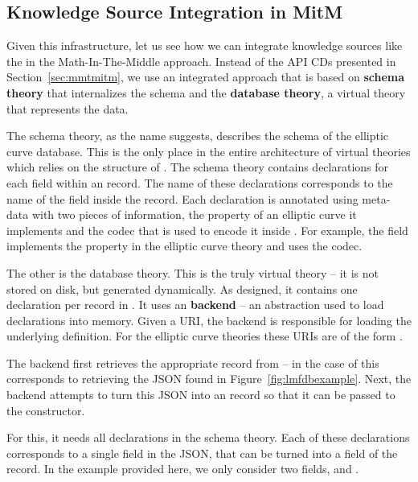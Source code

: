 \subsection{Knowledge Source Integration in MitM}

Given this infrastructure, let us see how we can integrate knowledge sources like the
\lmfdb in the Math-In-The-Middle approach. Instead of the API CDs presented in
Section~\ref{sec:mmtmitm}, we use an integrated approach that is based on \textbf{schema
  theory} that internalizes the \lmfdb schema and the \textbf{database theory}, a virtual
theory that represents the \lmfdb data.

The schema theory, as the name suggests, describes the schema of the \lmfdb elliptic curve
database.  This is the only place in the entire architecture of virtual theories which
relies on the structure of \lmfdb.  The schema theory contains declarations for each field
within an \lmfdb record.  The name of these declarations corresponds to the name of the
field inside the record.  Each declaration is annotated using \mmt meta-data with two
pieces of information, the property of an elliptic curve it implements and the codec that
is used to encode it inside \lmfdb.  For example, the  field implements
the  property in the elliptic curve theory and uses the
 codec.

The other is the database theory. This is the truly virtual theory -- it is not stored on
disk, but generated dynamically.  As designed, it contains one declaration per record in
\lmfdb. It uses an \mmt \textbf{backend} -- an \mmt abstraction used to load declarations
into memory.  Given a URI, the backend is responsible for loading the underlying
definition.  For the elliptic curve theories these URIs are of the form
.

The backend first retrieves the appropriate record from {\lmfdb} -- in the case of
 this corresponds to retrieving the JSON found in
Figure~\ref{fig:lmfdbexample}.  Next, the backend attempts to turn this JSON into an \mmt
record so that it can be passed to the  constructor.

For this, it needs all declarations in the schema theory.  Each of these declarations
corresponds to a single field in the JSON, that can be turned into a field of the \mmt
record.  In the example provided here, we only consider two fields, 
and .

